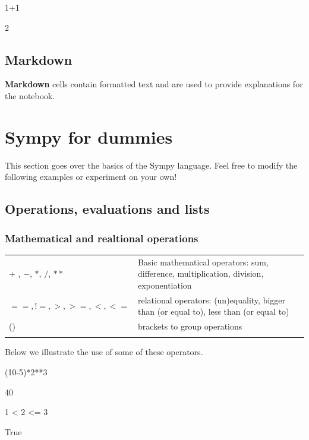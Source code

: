 \begin{pyin}
1+1
\end{pyin}
\begin{pyout}
2
\end{pyout}

\subsection{Markdown}
\textbf{Markdown} cells contain formatted text and are used to provide explanations for the notebook.

\section{Sympy for dummies}
\label{sec:SympyTutorial}
This section goes over the basics of the Sympy language. Feel free to modify the following examples or experiment on your own!

\subsection{Operations, evaluations and lists}
\subsubsection{Mathematical and realtional operations}

\begin{tabular}{>{\hfill}p{5cm}p{12cm}}
	$+$ , $-$, $*$, $/$, $**$	&	Basic mathematical operators: sum, difference, multiplication, division, exponentiation\\
	$==,!=,>,>=,<,<=$	& relational operators: (un)equality, bigger than (or equal to), less than (or equal to)\\
	()				&	brackets to group operations\\
	\multicolumn{2}{l}{} 
\end{tabular}

Below we illustrate the use of some of these operators. 


\begin{pyin}
(10-5)*2**3
\end{pyin}
\begin{pyout}
40
\end{pyout}

\begin{pyin}
1 < 2 <= 3
\end{pyin}
\begin{pyout}
True
\end{pyout}

